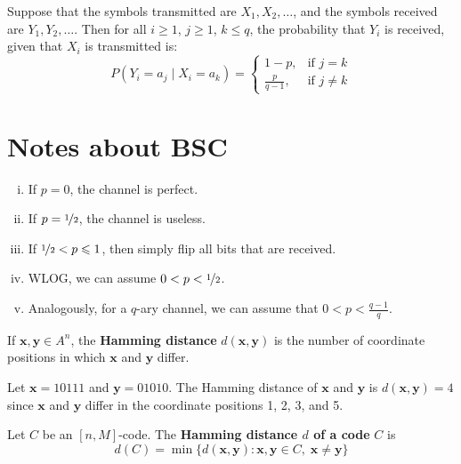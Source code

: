 Suppose that the symbols transmitted are $ X_1,X_2,\ldots $,
and the symbols received are $ Y_1,Y_2,\ldots $. Then for all
$ i\geqslant 1 $, $ j\geqslant 1 $, $ k\leqslant q $, the probability
that $ Y_i $ is received, given that $ X_i $ is transmitted is:
\[ P(Y_i=a_j\mid X_i=a_k)=
    \begin{cases}
        1-p,           & \text{if } j=k     \\
        \frac{p}{q-1}, & \text{if } j\neq k
    \end{cases} \]

\section{Notes about BSC}
\begin{enumerate}[(i)]
    \item If $ p=0 $, the channel is perfect.
    \item If $ p=\nicefrac{1}{2} $, the channel is useless.
    \item If $ \nicefrac{1}{2}<p\leqslant 1 $, then simply flip all bits that are received.
    \item WLOG, we can assume $ 0<p<\nicefrac{1}{2} $.
    \item Analogously, for a $ q $-ary channel, we can assume that $ 0<p<\frac{q-1}{q} $.
\end{enumerate}

\begin{defbox}
    \begin{definition}
        If $ \bm{x},\bm{y}\in A^n $, the \textbf{Hamming distance} $ d(\bm{x},\bm{y}) $ is
        the number of coordinate positions in which $ \bm{x} $ and $ \bm{y} $ differ.
    \end{definition} \end{defbox}

\begin{exbox}
    \begin{example}
        Let $ \bm{x} = 10111 $ and $ \bm{y} = 01010 $. The Hamming distance
        of $ \bm{x} $ and $ \bm{y} $ is $  d(\bm{x},\bm{y})=4  $
        since $ \bm{x} $ and $ \bm{y} $ differ in the coordinate positions
        1, 2, 3, and 5.
    \end{example}
\end{exbox}

\begin{defbox}
    \begin{definition}
        Let $ C $ be an $ [n,M] $-code.
        The \textbf{Hamming distance $ d $ of a code} $ C $ is
        \[ d(C)=\min \{d(\bm{x},\bm{y}):\bm{x},\bm{y}\in C,\;\bm{x}\neq \bm{y}\} \]
    \end{definition} \end{defbox}

